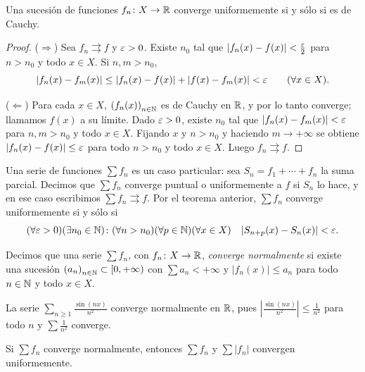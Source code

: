 \begin{theorem}
  Una sucesión de funciones \(f_n\colon X \to \mathbb{R}\) converge uniformemente si y sólo si es de Cauchy.
\end{theorem}

\begin{proof}
  (\(\Rightarrow\)) Sea \(f_n \rightrightarrows f\) y \(\varepsilon > 0\). Existe \(n_0\) tal que \(|f_n(x) - f(x)| < \frac{\varepsilon}{2}\) para \(n > n_0\) y todo \(x \in X\). Si \(n, m > n_0\),
  \[
    |f_n(x) - f_m(x)| \leq |f_n(x) - f(x)| + |f(x) - f_m(x)| < \varepsilon \qquad (\forall x \in X).
  \]

  (\(\Leftarrow\)) Para cada \(x \in X\), \({(f_n(x))}_{n \in \mathbb{N}}\) es de Cauchy en \(\mathbb{R}\), y por lo tanto converge; llamamos \(f(x)\) a su límite. Dado \(\varepsilon > 0\), existe \(n_0\) tal que \(|f_n(x) - f_m(x)| < \varepsilon\) para \(n, m > n_0\) y todo \(x \in X\). Fijando \(x\) y \(n > n_0\) y haciendo \(m \to +\infty\) se obtiene \(|f_n(x) - f(x)| \leq \varepsilon\) para todo \(n > n_0\) y todo \(x \in X\). Luego \(f_n \rightrightarrows f\).
\end{proof}

Una serie de funciones \(\sum f_n\) es un caso particular: sea \(S_n = f_1 + \cdots + f_n\) la suma parcial. Decimos que \(\sum f_n\) converge puntual o uniformemente a \(f\) si \(S_n\) lo hace, y en ese caso escribimos \(\sum f_n \rightrightarrows f\). Por el teorema anterior, \(\sum f_n\) converge uniformemente si y sólo si
\[
  (\forall \varepsilon > 0)(\exists n_0 \in \mathbb{N}) \colon (\forall n > n_0)(\forall p \in \mathbb{N})(\forall x \in X) \quad |S_{n+p}(x) - S_n(x)| < \varepsilon.
\]

\begin{definition}
  Decimos que una serie \(\sum f_n\), con \(f_n\colon X \to \mathbb{R}\), \emph{converge normalmente} si existe una sucesión \({(a_n)}_{n \in \mathbb{N}} \subset [0, +\infty)\) con \(\sum a_n < +\infty\) y \(|f_n(x)| \leq a_n\) para todo \(n \in \mathbb{N}\) y todo \(x \in X\).
\end{definition}

\begin{eg}
  La serie \(\sum_{n \geq 1} \frac{\sin(nx)}{n^2}\) converge normalmente en \(\mathbb{R}\), pues \(\left| \frac{\sin(nx)}{n^2} \right| \leq \frac{1}{n^2}\) para todo \(n\) y \(\sum \frac{1}{n^2}\) converge.
\end{eg}

\begin{theorem}
  Si \(\sum f_n\) converge normalmente, entonces \(\sum f_n\) y \(\sum |f_n|\) convergen uniformemente.
\end{theorem}

